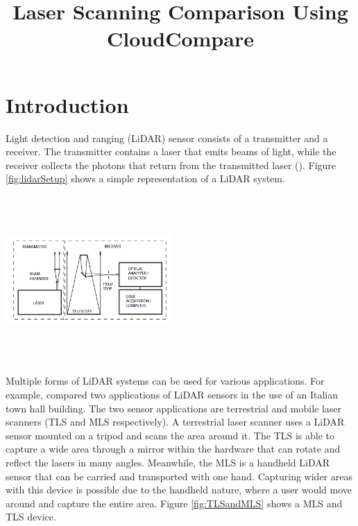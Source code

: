 \documentclass[man]{apa7}
\title{Laser Scanning Comparison Using CloudCompare}
\begin{document}
\maketitle
\tableofcontents
\newpage
\section{Introduction}
\vspace{-5em}
Light detection and ranging (LiDAR) sensor consists of a transmitter and a receiver. The transmitter contains a laser that emits beams of light, while the receiver collects the photons that return from the transmitted laser (\Textcite{wandinger2005}). Figure \ref{fig:lidarSetup} shows a simple representation of a LiDAR system.

\begin{minipage}{\linewidth}
  \includegraphics[bb=0in 0in 2.5in 2.5in, height=2.5in, width=2.5in]{figures/lidarSetup.png}
  \label{fig:lidarSetup}
\end{minipage}

Multiple forms of LiDAR systems can be used for various applications. For example, \Textcite{conti2024} compared two applications of LiDAR sensors in the use of an Italian town hall building. The two sensor applications are terrestrial and mobile laser scanners (TLS and MLS respectively). A terrestrial laser scanner uses a LiDAR sensor mounted on a tripod and scans the area around it. The TLS is able to capture a wide area through a mirror within the hardware that can rotate and reflect the lasers in many angles. Meanwhile, the MLS is a handheld LiDAR sensor that can be carried and transported with one hand. Capturing wider areas with this device is possible due to the handheld nature, where a user would move around and capture the entire area. Figure \ref{fig:TLSandMLS} shows a MLS and TLS device.
\end{document}
